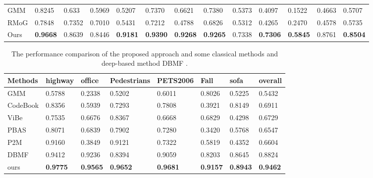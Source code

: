 \documentclass[runningheads,a4paper]{llncs}
\begin{document}
\begin{table}[tab1]
\begin{tabular}{lllllllllllll}
GMM         & 0.8245   & 0.633   & 0.5969     & 0.5207    & 0.7370 & 0.6621  & 0.7380   & 0.5373     & 0.4097     & 0.1522 & 0.4663  & 0.5707  \\
RMoG        & 0.7848   & 0.7352  & 0.7010     & 0.5431    & 0.7212 & 0.4788  & 0.6826   & 0.5312     & 0.4265     & 0.2470 & 0.4578  & 0.5735  \\ \hline
Ours        & \textbf{0.9668}   & 0.8639  & 0.8446     & \textbf{0.9181}    & \textbf{0.9390} & \textbf{0.9268}  & \textbf{0.9265}   & 0.7338     & \textbf{0.7306}     & \textbf{0.5845} & 0.8761  & \textbf{0.8504} \\ \hline
\end{tabular}
\end{table}

\begin{table}[tab2]
\centering
\caption{The performance comparison of the proposed approach and some classical methods and deep-based method DBMF .}
\label{tab2_res}
\begin{tabular}{llllllll}
\hline
Methods  & highway & office & Pedestrians & PETS2006 & Fall   & sofa   & overall \\ \hline
GMM      & 0.5788  & 0.2338 & 0.5202      & 0.6011   & 0.8026 & 0.5225 & 0.5432  \\
CodeBook & 0.8356  & 0.5939 & 0.7293      & 0.7808   & 0.3921 & 0.8149 & 0.6911  \\
ViBe     & 0.7535  & 0.6676 & 0.8367      & 0.6668   & 0.6829 & 0.4298 & 0.6729  \\
PBAS     & 0.8071  & 0.6839 & 0.7902      & 0.7280   & 0.3420 & 0.5768 & 0.6547  \\
P2M      & 0.9160  & 0.3849 & 0.9121      & 0.7322   & 0.5819 & 0.4352 & 0.6604  \\
DBMF     & 0.9412  & 0.9236 & 0.8394      & 0.9059   & 0.8203 & 0.8645 & 0.8824  \\ \hline
ours     & \textbf{0.9775}  & \textbf{0.9565} & \textbf{0.9652}      & \textbf{0.9681}   & \textbf{0.9157} & \textbf{0.8943} & \textbf{0.9462}  \\ \hline
\end{tabular}
\end{table}
\end{document}
